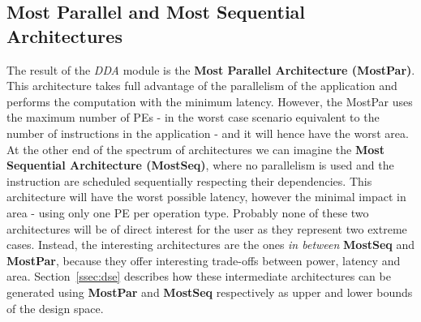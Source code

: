 \subsection{Most Parallel and Most Sequential Architectures}
\vspace{-1mm}
The result of the \textit{DDA} module is the \textbf{Most Parallel Architecture (MostPar)}. This architecture takes full advantage of the parallelism of the application and performs the computation with the minimum latency. However, the MostPar uses the maximum number of PEs - in the worst case scenario equivalent to the number of instructions in the application - and it will hence have the worst area.
At the other end of the spectrum of architectures we can imagine the \textbf{Most Sequential Architecture (MostSeq)}, where no parallelism is used and the instruction are scheduled sequentially respecting their dependencies. This architecture will have the worst possible latency, however the minimal impact in area - using only one PE per operation type.
Probably none of these two architectures will be of direct interest for the user as they represent two extreme cases. Instead, the interesting architectures are the ones \textit{in between} \textbf{MostSeq} and \textbf{MostPar}, because they offer interesting trade-offs between power, latency and area. Section~\ref{ssec:dse} describes how these intermediate architectures can be generated using \textbf{MostPar} and \textbf{MostSeq} respectively as upper and lower bounds of the design space.

